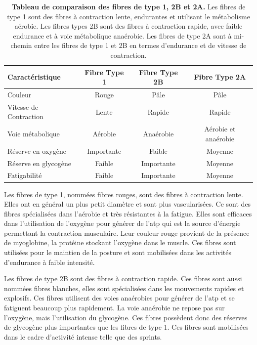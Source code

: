 \begin{table}[!ht]
\centering
\begin{tabular}{|l|c|c|c|} 
 \hline
 \textbf{Caractéristique} & \textbf{Fibre Type 1} & \textbf{Fibre Type 2B} & \textbf{Fibre Type 2A} \\
 \hline
Couleur & Rouge & Pâle & Pâle \\
Vitesse de Contraction & Lente & Rapide & Rapide \\
Voie métabolique & Aérobie & Anaérobie & Aérobie et anaérobie \\
Réserve en oxygène & Importante & Faible & Moyenne \\
Réserve en glycogène & Faible & Importante & Moyenne \\
Fatigabilité & Faible & Importante & Moyenne \\
 \hline
\end{tabular}
\caption[Tableau de comparaison des fibres de type 1, 2B et 2A.]{\textbf{Tableau de comparaison des fibres de type 1, 2B et 2A.} Les fibres de type 1 sont des fibres à contraction lente, endurantes et utilisant le métabolisme aérobie. Les fibres types 2B sont des fibres à contraction rapide, avec faible endurance et à voie métabolique anaérobie. Les fibres de type 2A sont à mi-chemin entre les fibres de type 1 et 2B en termes d'endurance et de vitesse de contraction.}
\label{table:fiber-compare}
\end{table}

Les fibres de type 1, nommées fibres rouges, sont des fibres à contraction lente. Elles ont en général un plus petit diamètre et sont plus vascularisées. Ce sont des fibres spécialisées dans l'aérobie et très résistantes à la fatigue. Elles sont efficaces dans l'utilisation de l'oxygène pour générer de l'\gls{atp} qui est la source d'énergie permettant la contraction musculaire. Leur couleur rouge provient de la présence de myoglobine, la protéine stockant l'oxygène dans le muscle. Ces fibres sont utilisées pour le maintien de la posture et sont mobilisées dans les activités d'endurance à faible intensité.


Les fibres de type 2B sont des fibres à contraction rapide. Ces fibres sont aussi nommées fibres blanches, elles sont spécialisées dans les mouvements rapides et explosifs. Ces fibres utilisent des voies anaérobies pour générer de l'\gls{atp} et se fatiguent beaucoup plus rapidement. La voie anaérobie ne repose pas sur l'oxygène, mais l'utilisation du glycogène. Ces fibres possèdent donc des réserves de glycogène plus importantes que les fibres de type 1. Ces fibres sont mobilisées dans le cadre d'activité intense telle que des sprints.


